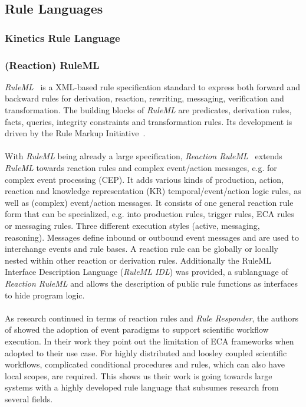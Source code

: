 \documentclass[11pt]{article}%
\begin{document}
\subsection{Rule Languages}
\subsubsection{Kinetics Rule Language}


\subsubsection{(Reaction) RuleML}
\textit{RuleML}~\cite{2006-Boley-RuleML.pdf} is a XML-based rule specification standard to express both forward and backward rules for derivation, reaction, rewriting, messaging, verification and transformation. The building blocks of \textit{RuleML} are predicates, derivation rules, facts, queries, integrity constraints and transformation rules. Its development is driven by the Rule Markup Initiative~\cite{wwwruleml}.
\\\\
With \textit{RuleML} being already a large specification, \textit{Reaction RuleML}~\cite{2012-Paschke_etal-ReactionRuleML.pdf} extends \textit{RuleML} towards reaction rules and complex event/action messages, e.g. for complex event processing (CEP). It adds various kinds of production, action, reaction and knowledge representation (KR) temporal/event/action logic rules, as well as (complex) event/action messages. It consists of one general reaction rule form that can be specialized, e.g. into production rules, trigger rules, ECA rules or messaging rules. Three different execution styles (active, messaging,  reasoning). Messages define inbound or outbound event messages and are used to interchange events and rule bases. A reaction rule can be globally or locally nested within other reaction or derivation rules. Additionally the RuleML Interface Description Language (\textit{RuleML IDL}) was provided, a sublanguage of \textit{Reaction RuleML} and allows the description of public rule functions as interfaces to hide program logic.
\\\\
As research continued in terms of reaction rules and \textit{Rule Responder}, the authors of \cite{2013_Zhao-Paschke_EDSWE.pdf} showed the adoption of event paradigms to support scientific workflow execution. In their work they point out the limitation of ECA frameworks when adopted to their use case. For highly distributed and loosley coupled scientific workflows, complicated conditional procedures and rules, which can also have local scopes, are required. This shows us their work is going towards large systems with a highly developed rule language that subsumes research from several fields. 
\end{document}
